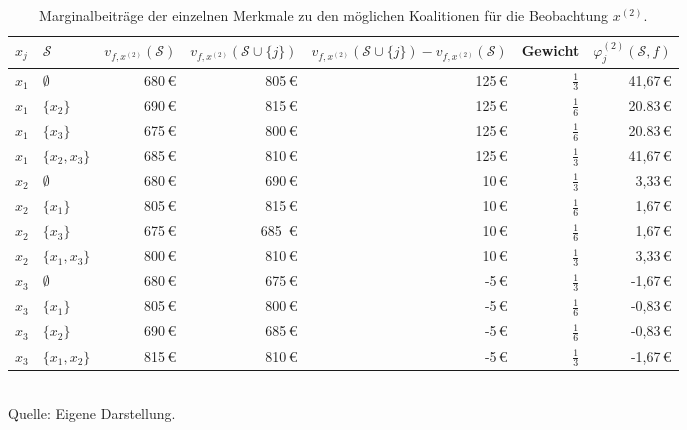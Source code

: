 \begin{table}[!h]
    \caption{Marginalbeiträge der einzelnen Merkmale zu den möglichen Koalitionen für die Beobachtung $x^{(2)}$.}
    \footnotesize
    \begin{tabularx}{\textwidth}{XXrrrrr}
    \toprule
    $x_{j}$ & $\mathcal{S}$ & $v_{f, x^{(2)}}(\mathcal{S})$ & $v_{f, x^{(2)}}(\mathcal{S} \cup \{j\})$ & $v_{f, x^{(2)}}(\mathcal{S} \cup \{j\}) - v_{f, x^{(2)}}(\mathcal{S})$ & Gewicht & $\varphi_{j}^{(2)}(\mathcal{S}, f)$\\
    \midrule
    $x_1$ & $\emptyset$ & 680\,\euro{} & 805\,\euro{} & 125\,\euro{} & $\frac{1}{3}$ & 41,67\,\euro{} \\
    $x_1$ & $\{x_2\}$ & 690\,\euro{} & 815\,\euro{} & 125\,\euro{} & $\frac{1}{6}$ & 20.83\,\euro{} \\
    $x_1$ & $\{x_3\}$ & 675\,\euro{} & 800\,\euro{} & 125\,\euro{} & $\frac{1}{6}$ & 20.83\,\euro{} \\
    $x_1$ & $\{x_2, x_3\}$ & 685\,\euro{} & 810\,\euro{} & 125\,\euro{} & $\frac{1}{3}$ & 41,67\,\euro{} \\
    $x_2$ & $\emptyset$ & 680\,\euro{} & 690\,\euro{} & 10\,\euro{} & $\frac{1}{3}$ & 3,33\,\euro{} \\
    $x_2$ & $\{x_1\}$ & 805\,\euro{} & 815\,\euro{} & 10\,\euro{} & $\frac{1}{6}$ & 1,67\,\euro{} \\
    $x_2$ & $\{x_3\}$ & 675\,\euro{} & 685 \,\euro{}& 10\,\euro{} & $\frac{1}{6}$ & 1,67\,\euro{} \\
    $x_2$ & $\{x_1, x_3\}$ & 800\,\euro{} & 810\,\euro{} & 10\,\euro{} & $\frac{1}{3}$ & 3,33\,\euro{} \\
    $x_3$ & $\emptyset$ & 680\,\euro{} & 675\,\euro{} & -5\,\euro{} & $\frac{1}{3}$ & -1,67\,\euro{} \\
    $x_3$ & $\{x_1\}$ & 805\,\euro{} & 800\,\euro{} & -5\,\euro{} & $\frac{1}{6}$ & -0,83\,\euro{} \\
    $x_3$ & $\{x_2\}$ & 690\,\euro{} & 685\,\euro{} & -5\,\euro{} & $\frac{1}{6}$ & -0,83\,\euro{} \\
    $x_3$ & $\{x_1, x_2\}$ & 815\,\euro{} & 810\,\euro{} & -5\,\euro{} & $\frac{1}{3}$ & -1,67\,\euro{} \\
    \bottomrule
    \end{tabularx}
    \label{tab:shapley_marginal_features_x2}
    \normalsize\\
    Quelle: Eigene Darstellung.
\end{table}

